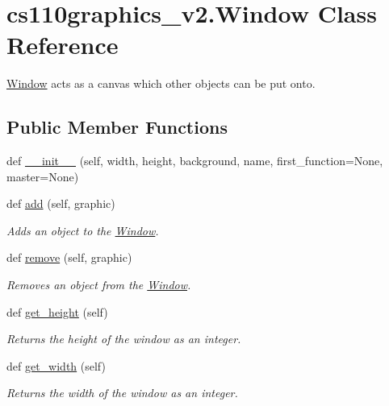 \hypertarget{classcs110graphics__v2_1_1Window}{}\section{cs110graphics\+\_\+v2.\+Window Class Reference}
\label{classcs110graphics__v2_1_1Window}


\mbox{\hyperlink{classcs110graphics__v2_1_1Window}{Window}} acts as a canvas which other objects can be put onto.  


\subsection*{Public Member Functions}
\begin{DoxyCompactItemize}
\item 
def \mbox{\hyperlink{classcs110graphics__v2_1_1Window_a93fbb743ae7c0e4461ed019915e57172}{\+\_\+\+\_\+init\+\_\+\+\_\+}} (self, width, height, background, name, first\+\_\+function=None, master=None)
\item 
def \mbox{\hyperlink{classcs110graphics__v2_1_1Window_ad2e9593c90d1672b40750c6d321eefca}{add}} (self, graphic)
\begin{DoxyCompactList}\small\item\em Adds an object to the \mbox{\hyperlink{classcs110graphics__v2_1_1Window}{Window}}. \end{DoxyCompactList}\item 
def \mbox{\hyperlink{classcs110graphics__v2_1_1Window_a684106ecf2dbfb9159731afb7698e238}{remove}} (self, graphic)
\begin{DoxyCompactList}\small\item\em Removes an object from the \mbox{\hyperlink{classcs110graphics__v2_1_1Window}{Window}}. \end{DoxyCompactList}\item 
def \mbox{\hyperlink{classcs110graphics__v2_1_1Window_ac29879272cf20339e3d8d94e7c763b76}{get\+\_\+height}} (self)
\begin{DoxyCompactList}\small\item\em Returns the height of the window as an integer. \end{DoxyCompactList}\item 
def \mbox{\hyperlink{classcs110graphics__v2_1_1Window_a94c8bd08e4b0d3aab302e34bef5751b7}{get\+\_\+width}} (self)
\begin{DoxyCompactList}\small\item\em Returns the width of the window as an integer. \end{DoxyCompactList}\item 

\end{DoxyCompactItemize}
